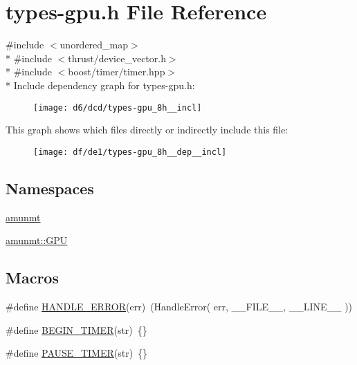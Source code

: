 \hypertarget{types-gpu_8h}{}\section{types-\/gpu.h File Reference}
\label{types-gpu_8h}
{\ttfamily \#include $<$unordered\+\_\+map$>$}\\*
{\ttfamily \#include $<$thrust/device\+\_\+vector.\+h$>$}\\*
{\ttfamily \#include $<$boost/timer/timer.\+hpp$>$}\\*
Include dependency graph for types-\/gpu.h\+:
\nopagebreak
\begin{figure}[H]
\begin{center}
\leavevmode
\texttt{[image: d6/dcd/types-gpu\_8h\_\_incl]}
\end{center}
\end{figure}
This graph shows which files directly or indirectly include this file\+:
\nopagebreak
\begin{figure}[H]
\begin{center}
\leavevmode
\texttt{[image: df/de1/types-gpu\_8h\_\_dep\_\_incl]}
\end{center}
\end{figure}
\subsection*{Namespaces}
\begin{DoxyCompactItemize}
\item 
 \hyperlink{namespaceamunmt}{amunmt}
\item 
 \hyperlink{namespaceamunmt_1_1GPU}{amunmt\+::\+G\+PU}
\end{DoxyCompactItemize}
\subsection*{Macros}
\begin{DoxyCompactItemize}
\item 
\#define \hyperlink{types-gpu_8h_af415eaa6c6ad014020a7ece805612466}{H\+A\+N\+D\+L\+E\+\_\+\+E\+R\+R\+OR}(err)~(Handle\+Error( err, \+\_\+\+\_\+\+F\+I\+L\+E\+\_\+\+\_\+, \+\_\+\+\_\+\+L\+I\+N\+E\+\_\+\+\_\+ ))
\item 
\#define \hyperlink{types-gpu_8h_a5ac3df3e0b737334da2bdc07aa8093dc}{B\+E\+G\+I\+N\+\_\+\+T\+I\+M\+ER}(str)~\{\}
\item 
\#define \hyperlink{types-gpu_8h_a75141a93e26693d16bb3f3cfab03e6d6}{P\+A\+U\+S\+E\+\_\+\+T\+I\+M\+ER}(str)~\{\}
\end{DoxyCompactItemize}
